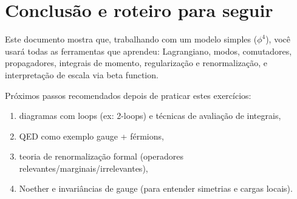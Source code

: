 \documentclass[12pt,a4paper]{article}
\begin{document}
\section{Conclusão e roteiro para seguir}
Este documento mostra que, trabalhando com um modelo simples (\(\phi^4\)), você usará todas as ferramentas que aprendeu: Lagrangiano, modos, comutadores, propagadores, integrais de momento, regularização e renormalização, e interpretação de escala via beta function.

Próximos passos recomendados depois de praticar estes exercícios:
\begin{enumerate}
\item diagramas com loops (ex: 2-loops) e técnicas de avaliação de integrais,
\item QED como exemplo gauge + férmions,
\item teoria de renormalização formal (operadores relevantes/marginais/irrelevantes),
\item Noether e invariâncias de gauge (para entender simetrias e cargas locais).
\end{enumerate}
\end{document}
